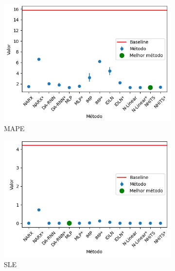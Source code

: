 \begin{figure}[htbp]
	\centering
	\begin{subfigure}[b]{0.3\textwidth}
		\centering
		\includegraphics[width=\textwidth]{figuras/mape_takens_brasil_oil_results.png}
		\caption{\ac{MAPE}}
		\label{fig:mape_takens_brasil_oil_results}
	\end{subfigure}
	\hfill
	\begin{subfigure}[b]{0.3\textwidth}
		\centering
		\includegraphics[width=\textwidth]{figuras/sle_takens_brasil_oil_results.png}
		\caption{\ac{SLE}}
		\label{fig:sle_takens_brasil_oil_results}
	\end{subfigure}
	\hfill
	\begin{subfigure}[b]{0.3\textwidth}
		\centering

\end{subfigure}
\end{figure}
